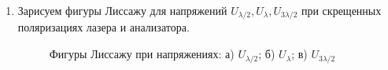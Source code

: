 \documentclass[12pt,a4paper]{article}
\begin{document}
\begin{enumerate}
		\item Зарисуем фигуры Лиссажу для напряжений $U_{\lambda / 2}, U_\lambda, U_{3\lambda / 2}$ при скрещенных поляризациях лазера и анализатора.
		\begin{figure}[h!]
			\begin{minipage}[h]{0.3\linewidth}
			\end{minipage}
			\hfill
			\begin{minipage}[h]{0.3\linewidth}
			\end{minipage}
			\hfill
			\begin{minipage}[h]{0.3\linewidth}
			\end{minipage}
		\caption{Фигуры Лиссажу при напряжениях: а) $U_{\lambda / 2}$; б) $U_\lambda$; в) $U_{3\lambda / 2}$}
		\end{figure}
	\end{enumerate}
    
\end{document}
